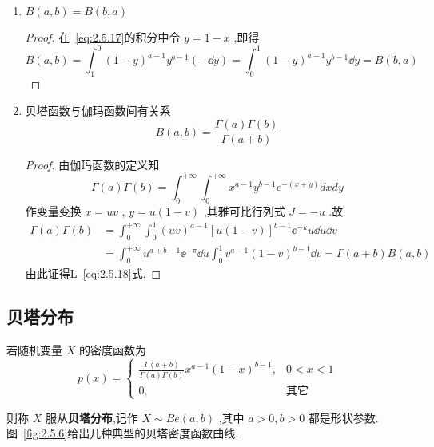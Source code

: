 \begin{enumerate}
	\item $ B(a, b)=B(b, a) $ 
	\begin{proof}
		在~\ref{eq:2.5.17}的积分中令 $ y=1-x $ ,即得
		\[
		B(a, b)=\int_{1}^{0}(1-y)^{a-1} y^{b-1}(-\dd y)=\int_{0}^{1}(1-y)^{a-1} y^{b-1} \dd y=B(b, a)
		\]
	\end{proof}
	\item 贝塔函数与伽玛函数间有关系
	\begin{equation}
	B(a, b)=\frac{\Gamma(a) \Gamma(b)}{\Gamma(a+b)} \label{eq:2.5.18}
	\end{equation}
	\begin{proof}
		由伽玛函数的定义知
		\[
		\Gamma(a) \Gamma(b)=\int_{0}^{+\infty} \int_{0}^{+\infty} x^{a-1} y^{b-1} e^{-(x+y)} d x d y
		\]
		作变量变换 $ x=uv $ , $ y=u(1-v) $ ,其雅可比行列式 $ J=-u $ .故
		\[
		\begin{aligned} \Gamma(a) \Gamma(b) &=\int_{0}^{+\infty} \int_{0}^{1}(u v)^{a-1}[u(1-v)]^{b-1} \ee ^{-k} u \dd u \dd v \\ &=\int_{0}^{+\infty} u^{a+b-1} \ee ^{-\pi} \dd u \int_{0}^{1} v^{a-1}(1-v)^{b-1} \dd v=\Gamma(a+b) B(a, b) \end{aligned}
		\]
		由此证得L~\ref{eq:2.5.18}式.
	\end{proof}
\end{enumerate}

\subsection{贝塔分布}\label{ssec:2.5.6}

若随机变量 $ X $ 的密度函数为
\begin{equation}
p(x)=\left\{\begin{array}{ll}
{\frac{\Gamma(a+b)}{\Gamma(a) \Gamma(b)} x^{a-1}(1-x)^{b-1},} & { 0<x<1}\\ 
{0,} & {\text{其它}}
\end{array}
\right. \label{eq:2.5.19}
\end{equation}

则称 $ X $ 服从\textbf{贝塔分布},记作 $ X \sim B e(a, b) $ ,其中 $ a>0,b>0 $ 都是形状参数.图~\ref{fig:2.5.6}给出几种典型的贝塔密度函数曲线.

